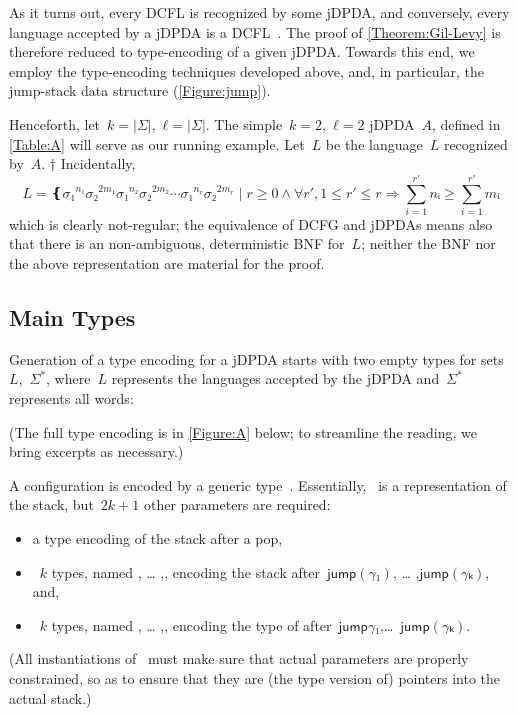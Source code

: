 As it turns out, every DCFL is recognized by some jDPDA, and conversely, 
  every language accepted by a jDPDA
  is a DCFL~\cite{Courcelle:77}.
The proof of \cref{Theorem:Gil-Levy} is therefore reduced to type-encoding of a given jDPDA.
Towards this end, we employ the type-encoding techniques developed above, and, in particular, the jump-stack data structure (\cref{Figure:jump}).

Henceforth, let~$k =|Σ|$,~$ℓ=|Σ|$.
The simple~$k=2$,~$ℓ=2$ jDPDA~$A$, defined in \cref{Table:A} will serve as our running example.
Let~$L$ be the language~$L$ recognized by~$A$.%
†{
  Incidentally,
\[
  L = ❴ σ₁^{n₁}σ₂^{2m₁} σ₁^{n₂}σ₂^{2m₂} ⋯ σ₁^{n_r}σ₂^{2m_r} \; | \; r≥0∧∀r', 1≤r'≤r⇒\sum_{i=1}^{r'} nᵢ≥\sum_{i=1}^{r'} mᵢ
\]
which is clearly not-regular; the equivalence of DCFG and jDPDAs means also that there is an non-ambiguous, deterministic
BNF for~$L$; neither the BNF nor the above representation are material for the proof.
}

\subsection{Main Types}
Generation of a type encoding for a jDPDA starts with two empty types for sets~$L$,~$Σ^*$,
  where~$L$ represents the languages accepted by the jDPDA and~$Σ^*$ represents all words:
\begin{quote}
\end{quote}
(The full type encoding is in \cref{Figure:A} below; to streamline the reading, we bring
  excerpts as necessary.)

A configuration is encoded by a generic type~.
Essentially,~ is a representation of the stack,
  but~$2k+1$ other parameters are required:
\begin{itemize}
  \item {} a type encoding of the stack after a pop,
  \item~$k$ types, named , … ,, encoding the stack
        after~$\textsf{jump}(γ₁)$, … ,$\textsf{jump}(γₖ)$, and,
  \item~$k$ types, named , … ,, encoding the type of 
    after~$\textsf{jump}{γ₁}$,…~$\textsf{jump}(γₖ)$.
\end{itemize}
(All instantiations of~ must make sure that actual parameters are properly constrained,
so as to ensure that they are (the type version of) pointers into the actual stack.)


